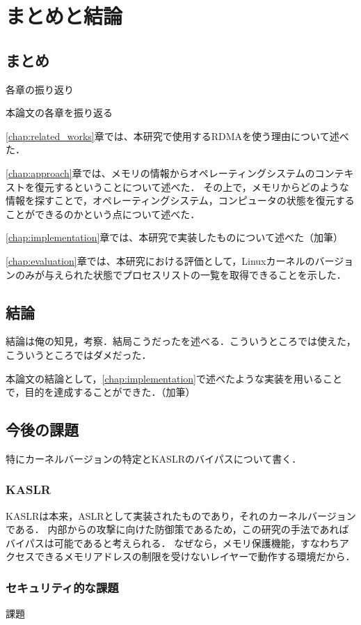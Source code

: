 \chapter{まとめと結論}
\label{chap:conclusion}

\section{まとめ}

各章の振り返り

本論文の各章を振り返る

\ref{chap:related_works}章では、本研究で使用するRDMAを使う理由について述べた．

\ref{chap:approach}章では、メモリの情報からオペレーティングシステムのコンテキストを復元するということについて述べた．
その上で，メモリからどのような情報を探すことで，オペレーティングシステム，コンピュータの状態を復元することができるのかという点について述べた．

\ref{chap:implementation}章では、本研究で実装したものについて述べた（加筆）

\ref{chap:evaluation}章では、本研究における評価として，Linuxカーネルのバージョンのみが与えられた状態でプロセスリストの一覧を取得できることを示した．

\section{結論}

結論は俺の知見，考察．結局こうだったを述べる．こういうところでは使えた，こういうところではダメだった．

本論文の結論として，\ref{chap:implementation}で述べたような実装を用いることで，目的を達成することができた．（加筆）

\section{今後の課題}

特にカーネルバージョンの特定とKASLRのバイパスについて書く．

\subsection{KASLR}

KASLRは本来，ASLRとして実装されたものであり，それのカーネルバージョンである．
内部からの攻撃に向けた防御策であるため，この研究の手法であればバイパスは可能であると考えられる．
なぜなら，メモリ保護機能，すなわちアクセスできるメモリアドレスの制限を受けないレイヤーで動作する環境だから．

\subsection{セキュリティ的な課題}

課題
